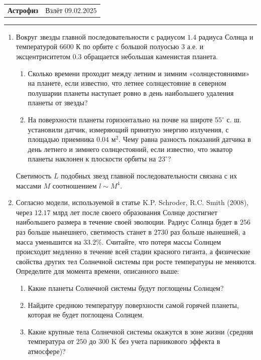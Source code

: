 \documentclass[12pt]{article}
\begin{document}
\begin{tabularx}{\textwidth}{Xr}
{\Large \textbf{Астрофиз}} & Взлёт $09.02.2025$ \\
\end{tabularx}
\noindent\rule{\textwidth}{0.4pt}
\begin{enumerate}
    \item Вокруг звезды главной последовательности с радиусом $1.4$ радиуса Солнца и температурой $6600$ К по орбите с большой полуосью $3$ а.е. и эксцентриситетом $0.3$ обращается небольшая каменистая планета.
    \begin{enumerate}
        \item Сколько времени проходит между летним и зимним «солнцестояниями» на планете, если известно, что летнее солнцестояние в северном полушарии планеты наступает ровно в день наибольшего удаления планеты от звезды?
        \item На поверхности планеты горизонтально на почве на широте $55^{\circ}$ с. ш. установили датчик, измеряющий принятую энергию излучения, с площадью приемника $0.04$ м$^2$. Чему равна разность показаний датчика в день летнего и зимнего солнцестояний, если известно, что экватор планеты наклонен к плоскости орбиты на $23^{\circ}$?
    \end{enumerate}
    Светимость $L$ подобных звезд главной последовательности связана с их массами $M$ соотношением $l\sim M^4$.
    \item Согласно модели, используемой в статье K.P. Schroder, R.C. Smith (2008), через $12.17$ млрд лет после своего образования Солнце достигнет наибольшего размера в течение своей эволюции. Радиус Солнца будет в $256$ раз больше нынешнего, светимость станет в $2730$ раз больше нынешней, а масса уменьшится на $33.2\%$. Считайте, что потеря массы Солнцем происходит медленно в течение всей стадии красного гиганта, а физические свойства других тел Солнечной системы при росте температуры не меняются.
    Определите для момента времени, описанного выше:
    \begin{enumerate}
        \item Какие планеты Солнечной системы будут поглощены Солнцем?
        \item Найдите среднюю температуру поверхности самой горячей планеты, которая не будет поглощена Солнцем.
        \item Какие крупные тела Солнечной системы окажутся в зоне жизни (средняя температура от $250$ до $300$ K без учета парникового эффекта в атмосфере)?
    \end{enumerate}

\end{enumerate}
\end{document}
